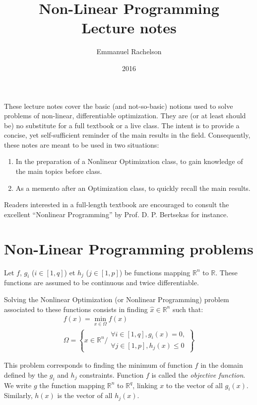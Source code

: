 \documentclass{article}
\title{Non-Linear Programming\\ Lecture notes}
\author{Emmanuel Rachelson}
\date{2016}
\begin{document}
\maketitle

These lecture notes cover the basic (and not-so-basic) notions used to solve problems of non-linear, differentiable optimization. They are (or at least should be) no substitute for a full textbook or a live class. The intent is to provide a concise, yet self-sufficient reminder of the main results in the field. Consequently, these notes are meant to be used in two situations:
\begin{enumerate}
\item In the preparation of a Nonlinear Optimization class, to gain knowledge of the main topics before class.
\item As a memento after an Optimization class, to quickly recall the main results.
\end{enumerate}


Readers interested in a full-length textbook are encouraged to consult the excellent ``Nonlinear Programming'' by Prof. D. P. Bertsekas for instance.

\section{Non-Linear Programming problems}

Let $f$, $g_i$ ($i\in [1,q]$) et $h_j$ ($j\in [1,p]$) be functions mapping $\mathbb{R}^n$ to $\mathbb{R}$. These functions are assumed to be continuous and twice differentiable.

\noindent Solving the Nonlinear Optimization (or Nonlinear Programming) problem associated to these functions consists in finding $\hat{x}\in\mathbb{R}^n$ such that:
\begin{gather*}
f(x) = \min\limits_{x\in \Omega} f(x)\\
\Omega = \left\{ x\in \mathbb{R}^n / \begin{array}{c} \forall i\in [1,q], g_i(x)=0, \\ \forall j\in
[1,p], h_j(x) \leq 0 \end{array} \right\}
\end{gather*}

\noindent This problem corresponds to finding the minimum of function $f$ in the domain defined by the $g_i$ and $h_j$ constraints. Function $f$ is called the \emph{objective function}. We write $g$ the function mapping $\mathbb{R}^n$ to
$\mathbb{R}^q$, linking $x$ to the vector of all $g_i(x)$. Similarly, $h(x)$ is the vector of all $h_j(x)$.
\end{document}
